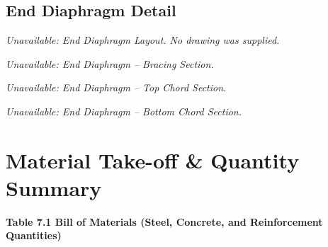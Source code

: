 \documentclass[12pt,a4paper]{report}
\numberwithin{table}{chapter}
\numberwithin{figure}{chapter}
\begin{document}
\section{End Diaphragm Detail}
\label{sec:diaphragm-detail}

\noindent\textit{Unavailable: End Diaphragm Layout. No drawing was supplied.}\par


\noindent
\begin{minipage}[t]{0.31\textwidth}\textit{Unavailable: End Diaphragm -- Bracing Section.}\end{minipage}
\hfill
\begin{minipage}[t]{0.31\textwidth}\textit{Unavailable: End Diaphragm -- Top Chord Section.}\end{minipage}
\hfill
\begin{minipage}[t]{0.31\textwidth}\textit{Unavailable: End Diaphragm -- Bottom Chord Section.}\end{minipage}


\setcounter{chapter}{6}
\chapter{Material Take-off \& Quantity Summary}
\label{ch:material-takeoff}

\noindent\textbf{Table 7.1  Bill of Materials (Steel, Concrete, and Reinforcement Quantities)}

\begingroup
\end{document}
